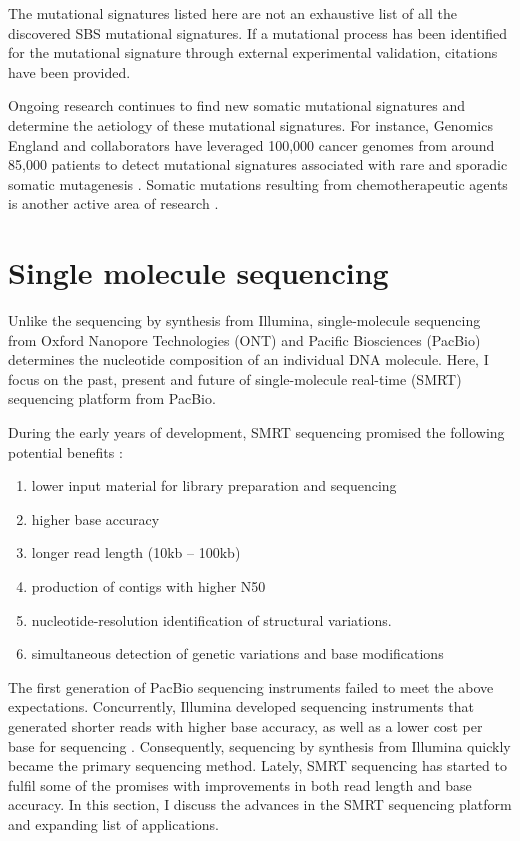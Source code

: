 \endgroup

The mutational signatures listed here are not an exhaustive list of all the discovered SBS mutational signatures. If a mutational process has been identified for the mutational signature through external experimental validation, citations have been provided. 

Ongoing research continues to find new somatic mutational signatures and determine the aetiology of these mutational signatures. For instance, Genomics England and collaborators have leveraged 100,000 cancer genomes from around 85,000 patients to detect mutational signatures associated with rare and sporadic somatic mutagenesis \cite{Degasperi2022-qe}. Somatic mutations resulting from chemotherapeutic agents is another active area of research \cite{Pich2019-ja, Aitken2020-sa}. 

\section{Single molecule sequencing}

Unlike the sequencing by synthesis from Illumina, single-molecule sequencing from Oxford Nanopore Technologies (ONT) and Pacific Biosciences (PacBio) determines the nucleotide composition of an individual DNA molecule. Here, I focus on the past, present and future of single-molecule real-time (SMRT) sequencing platform from PacBio. 

During the early years of development, SMRT sequencing promised the following potential benefits \cite{}:

\begin{enumerate}
\item lower input material for library preparation and sequencing
\item higher base accuracy
\item longer read length (10kb – 100kb)
\item production of contigs with higher N50
\item nucleotide-resolution identification of structural variations. 
\item simultaneous detection of genetic variations and base modifications
\end{enumerate}

The first generation of PacBio sequencing instruments failed to meet the above expectations. Concurrently, Illumina developed sequencing instruments that generated shorter reads with higher base accuracy, as well as a lower cost per base for sequencing \cite{Bentley2008-kl}. Consequently, sequencing by synthesis from Illumina quickly became the primary sequencing method. Lately, SMRT sequencing has started to fulfil some of the promises with improvements in both read length and base accuracy. In this section, I discuss the advances in the SMRT sequencing platform and expanding list of applications. 

